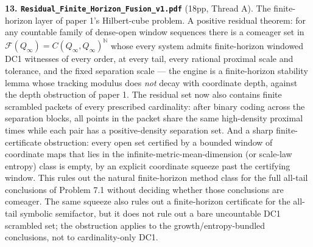 \documentclass[11pt]{article}
\begin{document}
\textbf{13. \texttt{Residual\_Finite\_Horizon\_Fusion\_v1.pdf}} (18pp, Thread A).
The finite-horizon layer of paper 1's Hilbert-cube problem.  A positive
residual theorem: for any countable family of dense-open window sequences there
is a comeager set in $\mathcal F(Q_\infty)=C(Q_\infty,Q_\infty)^{\mathbb N}$
whose every system admits finite-horizon windowed DC1 witnesses of every order,
at every tail, every rational proximal scale and tolerance, and the fixed
separation scale --- the engine is a finite-horizon stability lemma whose
tracking modulus does \emph{not} decay with coordinate depth, against the depth
obstruction of paper 1.  The residual set now also contains finite scrambled
packets of every prescribed cardinality: after binary coding across the
separation blocks, all points in the packet share the same high-density
proximal times while each pair has a positive-density separation set.  And a
sharp finite-certificate obstruction: every
open set certified by a bounded window of coordinate maps that lies in the
infinite-metric-mean-dimension (or scale-law entropy) class is empty, by an
explicit coordinate squeeze past the certifying window.  This rules out the
natural finite-horizon method class for the full all-tail conclusions of
Problem 7.1 without deciding whether those conclusions are comeager.  The same
squeeze also rules out a finite-horizon certificate for the all-tail symbolic
semifactor, but it does not rule out a bare uncountable DC1 scrambled set; the
obstruction applies to the growth/entropy-bundled conclusions, not to
cardinality-only DC1.
\end{document}
